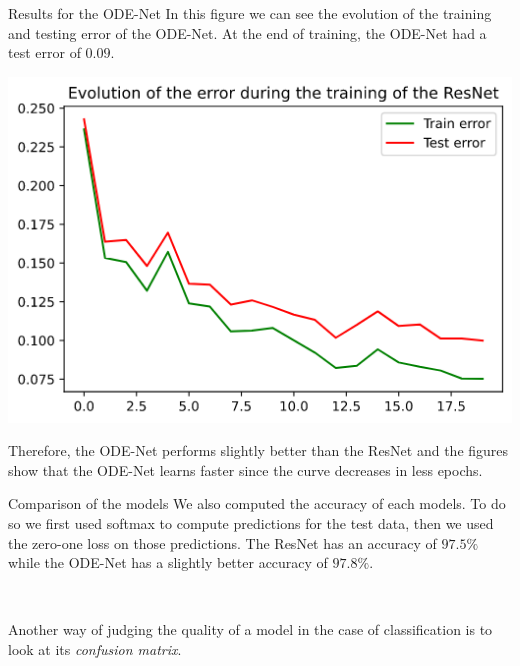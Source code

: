 \documentclass[11pt]{beamer}
\begin{document}
\begin{frame}{Results for the ODE-Net}
In this figure we can see the evolution of the training and testing error of the ODE-Net. At the end of training, the ODE-Net had a test error of $0.09$.
\begin{center}
\includegraphics[scale=0.4]{resnet_rd_loss.png}
\end{center}
Therefore, the ODE-Net performs slightly better than the ResNet and the figures show that the ODE-Net learns faster since the curve decreases in less epochs.
\end{frame}

\begin{frame}{Comparison of the models}
We also computed the accuracy of each models. To do so we first used softmax to compute predictions for the test data, then we used the zero-one loss on those predictions. The ResNet has an accuracy of $97.5\%$ while the ODE-Net has a slightly better accuracy of $97.8\%$.

~

Another way of judging the quality of a model in the case of classification is to look at its \textit{confusion matrix}.
\end{frame}
\end{document}
